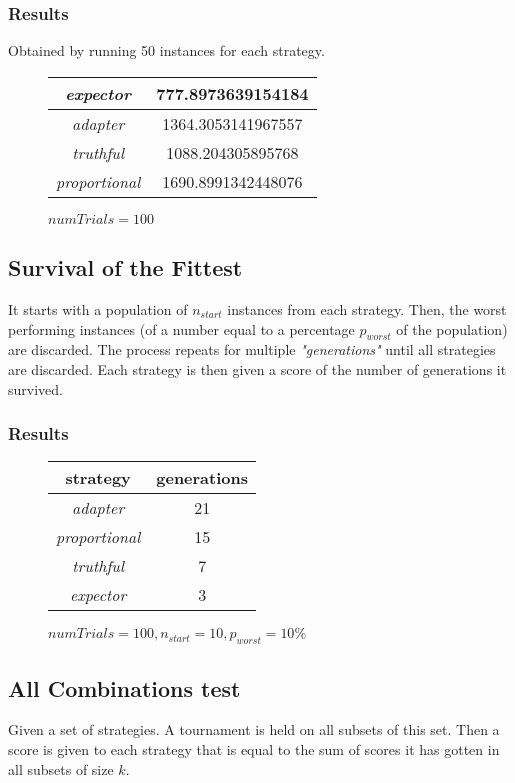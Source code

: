 \documentclass{article}
\newcommand{\expector}{\emph{expector }}
\newcommand{\adapter}{\emph{adapter }}
\newcommand{\truthful}{\emph{truthful }}
\newcommand{\proportional}{\emph{proportional }}
\theoremstyle{remark}
\theoremstyle{remark}
\begin{document}
\subsubsection*{Results}
Obtained by running 50 instances for each strategy.
\begin{figure}[H]
	\centering
	\begin{tabular}{||c c||} 
		\hline
		\expector &  777.8973639154184 \\
		\hline
		\adapter &  1364.3053141967557 \\
		\hline
		\truthful &  1088.204305895768 \\
		\hline
		\proportional &  1690.8991342448076 \\
		\hline
	\end{tabular}
	\caption{$ numTrials=100$}
\end{figure}

\subsection{Survival of the Fittest}
It starts with a population of $ n_{start} $ instances from each strategy. Then, the worst performing instances (of a number equal to a percentage $ p_{worst} $ of the population) are discarded. The process repeats for multiple \emph{"generations"} until all strategies are discarded. Each strategy is then given a score of the number of generations it survived.

\subsubsection*{Results}
\begin{figure}[H]
	\centering
	\begin{tabular}{||c c||} 
		\hline
		strategy & generations \\ [0.5ex] 
		\hline
		\adapter &  21 \\
		\hline
		\proportional &  15 \\
		\hline
		\truthful &  7 \\
		\hline
		\expector &  3 \\
		\hline
	\end{tabular}
	\caption{$ numTrials=100, n_{start}=10, p_{worst} = 10\%$}
\end{figure}

\subsection{All Combinations test}
Given a set of strategies. A tournament is held on all subsets of this set. Then a score is given to each strategy that is equal to the sum of scores it has gotten in all subsets of size $ k $. 
\end{document}
